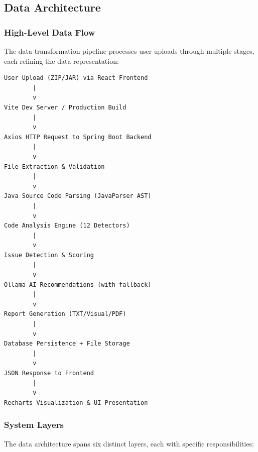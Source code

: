 \documentclass[12pt,a4paper]{article}
\begin{document}
    \subsection{Data Architecture}

    \subsubsection{High-Level Data Flow}

    The data transformation pipeline processes user uploads through multiple stages, each refining the data representation:

    \begin{Verbatim}[frame=single, fontsize=\small]
User Upload (ZIP/JAR) via React Frontend
        |
        v
Vite Dev Server / Production Build
        |
        v
Axios HTTP Request to Spring Boot Backend
        |
        v
File Extraction & Validation
        |
        v
Java Source Code Parsing (JavaParser AST)
        |
        v
Code Analysis Engine (12 Detectors)
        |
        v
Issue Detection & Scoring
        |
        v
Ollama AI Recommendations (with fallback)
        |
        v
Report Generation (TXT/Visual/PDF)
        |
        v
Database Persistence + File Storage
        |
        v
JSON Response to Frontend
        |
        v
Recharts Visualization & UI Presentation
    \end{Verbatim}

    \subsubsection{System Layers}

    The data architecture spans six distinct layers, each with specific responsibilities:
\end{document}
